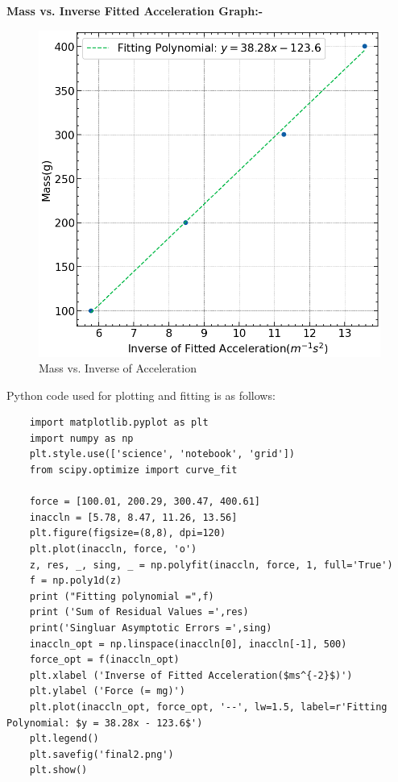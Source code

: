 \documentclass{article}
\begin{document}
\pagebreak

\textbf{Mass vs. Inverse Fitted Acceleration Graph:-}
 	
 	\begin{figure}[H]
 		\centering
 		\includegraphics[scale=0.8]{final2.png}
 		\caption{Mass vs. Inverse of Acceleration}
 		\label{figure:nick}%
 	\end{figure}
 
 Python code used for plotting and fitting is as follows:
 
 \begin{lstlisting}
 	import matplotlib.pyplot as plt
 	import numpy as np
 	plt.style.use(['science', 'notebook', 'grid'])
 	from scipy.optimize import curve_fit
 	
 	force = [100.01, 200.29, 300.47, 400.61]
 	inaccln = [5.78, 8.47, 11.26, 13.56]
 	plt.figure(figsize=(8,8), dpi=120)
 	plt.plot(inaccln, force, 'o')
 	z, res, _, sing, _ = np.polyfit(inaccln, force, 1, full='True')
 	f = np.poly1d(z)
 	print ("Fitting polynomial =",f)
 	print ('Sum of Residual Values =',res)
 	print('Singluar Asymptotic Errors =',sing)
 	inaccln_opt = np.linspace(inaccln[0], inaccln[-1], 500)
 	force_opt = f(inaccln_opt)
 	plt.xlabel ('Inverse of Fitted Acceleration($ms^{-2}$)')
 	plt.ylabel ('Force (= mg)')
 	plt.plot(inaccln_opt, force_opt, '--', lw=1.5, label=r'Fitting Polynomial: $y = 38.28x - 123.6$')
 	plt.legend()
 	plt.savefig('final2.png')
 	plt.show()
 \end{lstlisting}
\end{document}
